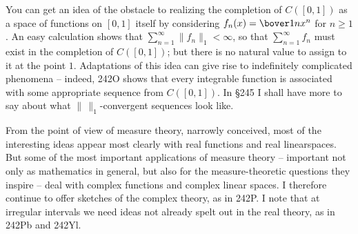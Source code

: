 {You can get an idea of the obstacle to realizing the completion of
$C([0,1])$ as a space of functions on $[0,1]$ itself by considering
$f_n(x)=\bover1nx^n$ for $n\ge 1$.   An easy calculation shows that
$\sum_{n=1}^{\infty}\|f_n\|_1<\infty$, so that $\sum_{n=1}^{\infty}f_n$
must exist in the completion of $C([0,1])$;  but there is no natural
value to assign to it at the point $1$.   Adaptations of this idea can
give rise to indefinitely complicated phenomena -- indeed, 242O shows
that every integrable function is associated with some appropriate
sequence from $C([0,1])$.   In \S245 I shall have more to say about
what $\|\,\|_1$-convergent sequences look like.

From the point of view of measure theory, narrowly conceived, most of
the interesting ideas appear most clearly with real functions and real
linearspaces.   But some of the most important applications of measure
theory -- important not only as mathematics in general, but also for
the measure-theoretic questions they inspire -- deal with complex
functions
and complex linear spaces.   I therefore continue to offer sketches of
the complex theory, as in 242P.   I note that at irregular intervals
we need
ideas not already spelt out in the real theory, as in 242Pb and 242Yl.
}%


\discrpage

